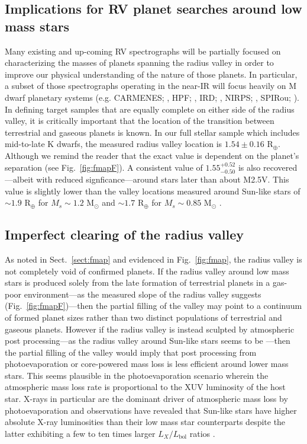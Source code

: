 \documentclass[twocolumn]{emulateapj}
\begin{document}
\subsection{Implications for RV planet searches around low mass stars}
Many existing and up-coming RV spectrographs
will be partially focused on characterizing the masses of planets spanning the radius valley in order to
improve our physical understanding of the nature of those planets. In particular, a subset of those spectrographs
operating in the near-IR will focus heavily on M dwarf planetary systems
(e.g. CARMENES; \citealt{quirrenbach14}, HPF; \citealt{mahadevan12}, IRD; \citealt{kotani14},
NIRPS; \citealt{bouchy17}, SPIRou; \citealt{donati18}). In defining target samples
that are equally complete on either side of the radius valley, it is critically important that the location
of the transition between terrestrial and gaseous planets is known. In our full stellar sample which includes
mid-to-late K dwarfs, the measured radius valley location is $1.54\pm 0.16$ R$_{\oplus}$. Although we remind the
reader that the exact value is dependent on the planet's separation (see Fig.~\ref{fig:fmapF}). A consistent value of
$1.55^{+0.52}_{-0.50}$ is also recovered---albeit with reduced signficance---around stars later than about M2.5V.
This value is slightly lower than the valley locations measured around Sun-like stars of
$\sim 1.9$ R$_{\oplus}$ for $M_s \sim 1.2$ M$_{\odot}$ and $\sim 1.7$ R$_{\oplus}$ for $M_s \sim 0.85$ M$_{\odot}$
\citep{fulton18}.

\subsection{Imperfect clearing of the radius valley} \label{sect:void}
As noted in Sect.~\ref{sect:fmap} and evidenced in Fig.~\ref{fig:fmap}, the radius valley is not completely
void of confirmed planets. If the radius valley around low mass stars is produced solely from the late formation
of terrestrial planets in a gas-poor environment---as the measured slope of the radius valley suggests
(Fig.~\ref{fig:fmapF})---then the partial filling of the valley may point to a continuum of formed planet sizes
rather than two distinct populations of terrestrial and gaseous planets. However if the radius valley is instead
sculpted by atmospheric post processing---as the radius valley around Sun-like stars seems to be
\citep{fulton17,fulton18,vaneylen18,martinez19}---then the partial filling of the valley would imply that post
processing from photoevaporation or core-powered mass loss is less efficient around lower mass stars.
This seems plausible in the photoevaporation scenario wherein the atmospheric mass loss rate is proportional to
the XUV luminosity of the host star. X-rays in particular are the dominant driver of atmospheric mass loss by
photoevaporation and observations have revealed that Sun-like stars have higher absolute X-ray luminosities than
their low mass star counterparts \citep{mcdonald19} despite the latter exhibiting a few to ten times larger
$L_X/L_{\text{bol}}$ ratios \citep{jackson12,shkolnik14}. 
\end{document}
